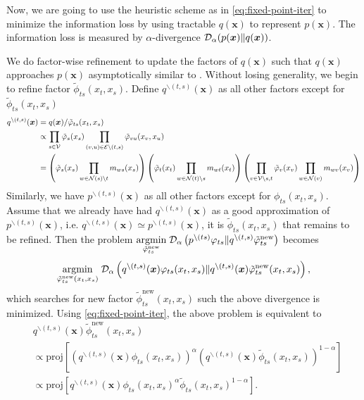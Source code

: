 \documentclass[conference,onecolumn]{IEEEtran}
\begin{document}
Now, we are going to use the heuristic scheme as in \autoref{eq:fixed-point-iter} to minimize the information loss by using tractable $q(\bm{x})$ to represent $p(\bm{x})$. The information loss is measured by $\alpha$-divergence $\mathcal{D}_{\alpha}(p(\bm{x}) \| q(\bm{x}))$.

We do factor-wise refinement to update the factors of $q(\bm{x})$ such that $q(\bm{x})$ approaches $p(\bm{x})$ asymptotically similar to \cite{divergence-measures-and-message-passing,Minka:2001:EPA:647235.720257}. Without losing generality, we begin to refine factor $\tilde{\phi}_{ts}(x_t, x_s)$. Define $q^{\backslash (t,s)}(\bm{x})$ as all other factors except for $\tilde{\phi}_{ts}(x_t, x_s)$
\begin{align}
  q^{\backslash (t,s)}(\bm{x})
  &= q(\bm{x})/\tilde{\varphi}_{ts}(x_t,
    x_s) \nonumber \\
  &\propto \prod_{{s\in \mathcal{V}}} \tilde{\varphi}_s(x_s) \prod_{(v,u) \in
    \mathcal{E}\backslash (t,s)}
    \tilde{\varphi}_{vu}(x_v, x_u) \nonumber \\
  &= \left(
    \tilde{\varphi}_s(x_s) \prod_{w\in \mathcal{N}(s) \backslash t}m_{ws}(x_s)
    \right)
    \left(
    \tilde{\varphi}_t(x_t) \prod_{w\in \mathcal{N}(t) \backslash s}m_{wt}(x_t)
    \right)
    \left(
    \prod_{v \in \mathcal{V} \backslash s,t}
    \tilde{\varphi}_v(x_v) \prod_{w\in \mathcal{N}(v)}m_{wv}(x_v)
    \right)\nonumber \\
\end{align}
Similarly, we have $p^{\backslash (t,s)}(\bm{x})$ as all other factors except for ${\phi}_{ts}(x_t, x_s)$. Assume that we already have had $q^{\backslash (t,s)}(\bm{x})$ as a good approximation of $p^{\backslash (t,s)}(\bm{x})$, i.e. $q^{\backslash (t,s)}(\bm{x}) \simeq p^{\backslash (t,s)}(\bm{x})$, it is $\tilde{\phi}_{ts}(x_t, x_s)$ that remains to be refined. 
Then the problem $\underset{\tilde{\varphi}_{ts}^{\mathrm{new}}}{\operatorname{argmin}}\; \mathcal{D}_{\alpha}\left(  p^{\backslash (ts)}\varphi_{ts}\|q^{\backslash (t,s)}\tilde{\varphi}_{ts}^{\mathrm{new}}\right)$ becomes \vspace{-0.3cm}
\begin{equation}
  \underset{\tilde{\varphi}_{ts}^{\mathrm{new}}(x_t, x_s)}{\operatorname{argmin}}\;
  \mathcal{D}_{\alpha}\left( q^{\backslash (t,s)}(\bm{x}){\varphi}_{ts}(x_t, x_s)
    \|q^{\backslash (t,s)}(\bm{x})\tilde{\varphi}_{ts}^{\mathrm{new}}(x_t, x_s) \right),
\end{equation}
which searches for new factor $\tilde{\phi}_{ts}^{\mathrm{new}}(x_t, x_s)$ such the above divergence is minimized.
Using \autoref{eq:fixed-point-iter}, the above problem is equivalent to
\begin{align}\label{eq:update-rule}
  &q^{\backslash (t,s)}(\bm{x})\tilde{\phi}_{ts}^{\mathrm{new}}(x_t, x_s)  \nonumber\\
  &\propto \text{proj}\left[ \left( q^{\backslash (t,s)}(\bm{x}){\phi}_{ts}(x_t, x_s) \right)^{\alpha} \left(q^{\backslash (t,s)}(\bm{x})\tilde{\phi}_{ts}(x_t, x_s)  \right)^{1-\alpha} \right] \nonumber \\
  & \propto \text{proj}\left[ q^{\backslash
    (t,s)}(\bm{x}){\phi}_{ts}(x_t, x_s)^{\alpha} \tilde{\phi}_{ts}(x_t, x_s)^{1-\alpha} \right].
\end{align}
\end{document}
